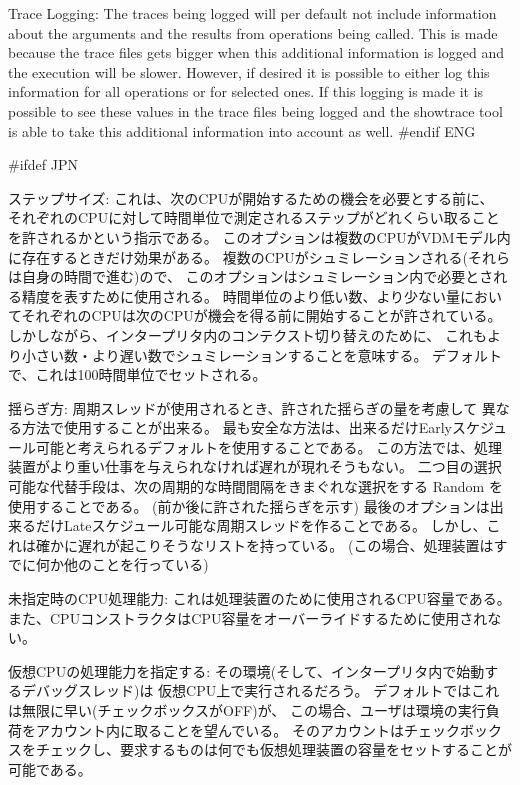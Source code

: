 \documentclass[\pformat,12pt]{article}
\begin{document}
\begin{list}{}{}
\item[{\sf Trace Logging}:] The traces being logged will per default
not include information about the arguments and the results from
operations being called. This is made because the trace files gets
bigger when this additional information is logged and the execution
will be slower. However, if desired it is possible to either log this
information for all operations or for selected ones. If this logging
is made it is possible to see these values in the trace files being
logged and the {\sf showtrace} tool is able to take this additional
information into account as well.
#endif ENG

#ifdef JPN
\item[{\sf ステップサイズ}:] 
これは、次のCPUが開始するための機会を必要とする前に、
それぞれのCPUに対して時間単位で測定されるステップがどれくらい取ることを許されるかという指示である。
このオプションは複数のCPUがVDMモデル内に存在するときだけ効果がある。
複数のCPUがシュミレーションされる(それらは自身の時間で進む)ので、
このオプションはシュミレーション内で必要とされる精度を表すために使用される。 
時間単位のより低い数、より少ない量においてそれぞれのCPUは次のCPUが機会を得る前に開始することが許されている。
しかしながら、インタープリタ内のコンテクスト切り替えのために、
これもより小さい数・より遅い数でシュミレーションすることを意味する。
デフォルトで、これは100時間単位でセットされる。

\item[{\sf 揺らぎ方}:] 周期スレッドが使用されるとき、許された揺らぎの量を考慮して
異なる方法で使用することが出来る。
最も安全な方法は、出来るだけ{\sf Early}スケジュール可能と考えられるデフォルトを使用することである。
この方法では、処理装置がより重い仕事を与えられなければ遅れが現れそうもない。
二つ目の選択可能な代替手段は、次の周期的な時間間隔をきまぐれな選択をする {\sf Random} を使用することである。
(前か後に許された揺らぎを示す)
最後のオプションは出来るだけ{\sf Late}スケジュール可能な周期スレッドを作ることである。
しかし、これは確かに遅れが起こりそうなリストを持っている。
(この場合、処理装置はすでに何か他のことを行っている)

\item[{\sf 未指定時のCPU処理能力}:] これは処理装置のために使用されるCPU容量である。
また、CPUコンストラクタはCPU容量をオーバーライドするために使用されない。

\item[{\sf 仮想CPUの処理能力を指定する}:] その環境(そして、インタープリタ内で始動するデバッグスレッド)は
仮想CPU上で実行されるだろう。
デフォルトではこれは無限に早い(チェックボックスがOFF)が、
この場合、ユーザは環境の実行負荷をアカウント内に取ることを望んでいる。
そのアカウントはチェックボックスをチェックし、要求するものは何でも仮想処理装置の容量をセットすることが可能である。


\end{list}
\end{document}
